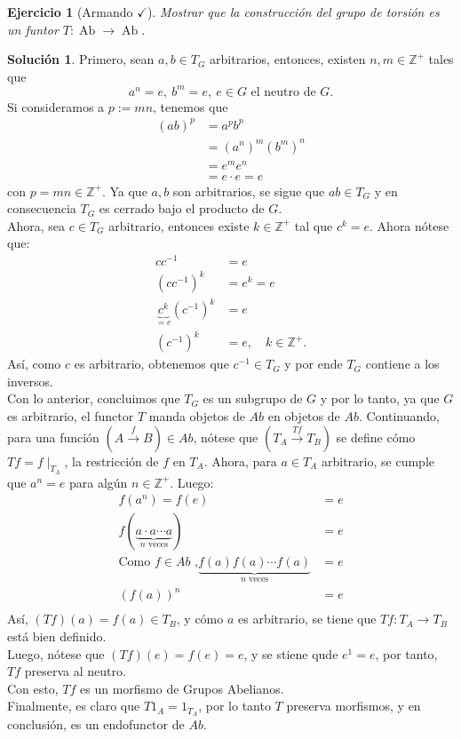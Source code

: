 \documentclass[12pt,letterpaper,titlepage]{article}
\newtheorem{exe}{Ejercicio}
\theoremstyle{definition}
\newtheorem*{sol}{Solución}
\newcommand\Z{\mathbb Z}
\newcommand\<{\langle}
\renewcommand\>{\rangle}
\DeclareMathOperator{\Ab}{Ab}
\begin{document}
\begin{exe}[Armando $\checkmark$]
  Mostrar que la construcción del grupo de torsión
  es un funtor $T:\Ab\to\Ab$.
\end{exe}
\begin{sol}
    Primero, sean $a,b\in T_G$ arbitrarios, entonces, existen $n,m\in\Z^+$ tales que
    \begin{equation*}
        a^n=e,\ b^m=e,\ e\in G \text{ el neutro de } G.
    \end{equation*}
    Si consideramos a $p:=mn$, tenemos que 
    \begin{align*}
        (ab)^p & = a^p b^p \\
               & = (a^n)^m (b^m)^n \\
               & = e^m e^n \\
               & = e \cdot e = e
    \end{align*}
    con $p=mn\in\Z^+$. Ya que $a,b$ son arbitrarios, se sigue que $ab\in T_G$ y en consecuencia $T_G$ es cerrado bajo el producto de $G$.\\
    Ahora, sea $c\in T_G$ arbitrario, entonces existe $k\in\Z^+$ tal que $c^k=e$. Ahora nótese que:
    \begin{align*}
        cc^{-1} & = e \\
        (cc^{-1})^k & = e^k = e \\
        \underbrace{c^k}_{=e}(c^{-1})^k & = e \\
        (c^{-1})^k & = e,\quad k\in\Z^+.
    \end{align*}
    Así, como $c$ es arbitrario, obtenemos que $c^{-1}\in T_G$ y por ende $T_G$ contiene a los inversos.\\
    Con lo anterior, concluimos que $T_G$ es un subgrupo de $G$ y por lo tanto, ya que $G$ es arbitrario, el functor $T$ manda objetos de $Ab$ en objetos de $Ab$.
    Continuando, para una función $(A\overset{f}{\to}B)\in Ab$, nótese que $(T_A\overset{Tf}{\to}T_B)$ se define cómo $Tf=f\mid_{T_A}$, la restricción de $f$ en $T_A$.
    Ahora, para $a\in T_A$ arbitrario, se cumple que $a^n=e$ para algún $n\in\Z^+$. Luego:
    \begin{align*}
        f(a^n) = f(e) & = e \\
        f\left(\underbrace{a\cdot a \cdots a}_{n \text{ veces}}\right) & = e \\
        \text{Como $f\in Ab$ ,} \underbrace{f(a)f(a)\cdots f(a)}_{n\text{ veces}} & = e \\
        \left(f(a)\right)^n & = e\\
    \end{align*}
    Así, $(Tf)(a)=f(a)\in T_B$, y cómo $a$ es arbitrario, se tiene que $Tf:T_A\to T_B$ está bien definido.\\
    Luego, nótese que $(Tf)(e)=f(e)=e$, y se stiene qude $e^1 = e$, por tanto, $Tf$ preserva al neutro.\\
    Con esto, $Tf$ es un morfismo de Grupos Abelianos.\\
    Finalmente, es claro que $T1_A=1_{T_A}$, por lo tanto $T$ preserva morfismos, y en conclusión, es un endofunctor de $Ab$. 
\end{sol}
\end{document}
